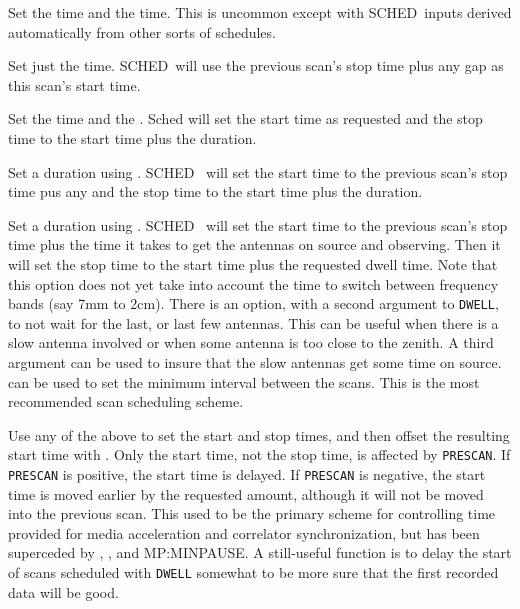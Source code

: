\documentclass{report}
\newcommand{\schedb}{{\sc SCHED~}}
\begin{document}
\begin{list}{}{\parsep 0em  \itemsep 0em }

\item Set the  time and the
 time.  This is uncommon except with
\schedb inputs derived automatically from other sorts of schedules.

\item Set just the  time.  \schedb will
use the previous scan's stop time plus any gap as this scan's start
time.

\item Set the  time and the
.  Sched will set the start time as
requested and the stop time to the start time plus the duration.

\item Set a duration using .  \schedb
will set the start time to the previous scan's stop time pus any
 and the stop time to the start time 
plus the duration.

\item Set a duration using .  \schedb
will set the start time to the previous scan's stop time plus the time
it takes to get the antennas on source and observing.  Then it will
set the stop time to the start time plus the requested dwell time.
Note that this option does not yet take into account the time to
switch between frequency bands (say 7mm to 2cm).  There is an option,
with a second argument to {\tt DWELL}, to not wait for the last, or
last few antennas.  This can be useful when there is a slow antenna
involved or when some antenna is too close to the zenith.  A third
argument can be used to insure that the slow antennas get some time on
source.  can be used to set the minimum
interval between the scans.  This is the most recommended scan
scheduling scheme.

\item Use any of the above to set the start and stop times, and then
offset the resulting start time with .  Only the start time, not the stop time, is
affected by {\tt PRESCAN}.  If {\tt PRESCAN} is positive, the start
time is delayed.  If {\tt PRESCAN} is negative, the start time is
moved earlier by the requested amount, although it will not be moved
into the previous scan.  This used to be the primary scheme for
controlling time provided for media acceleration and correlator
synchronization, but has been superceded by , , and
 {MP:MINPAUSE}.  A still-useful function is
to delay the start of scans scheduled with {\tt DWELL} somewhat to
be more sure that the first recorded data will be good.

\end{list}
\end{document}
